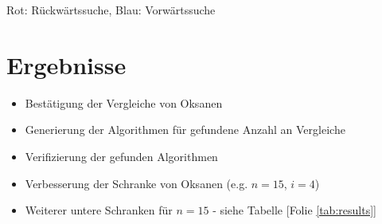 \begin{frame}{\insertsection}
  \begin{figure}[!b]
    \centering
    
  \end{figure}

  {\color{red} Rot: Rückwärtssuche},
  {\color{blue} Blau: Vorwärtssuche}

\end{frame}


\section{Ergebnisse}
\sectionframe{\insertsection}

\begin{frame}{\insertsection}
  \begin{itemize}
    \item Bestätigung der Vergleiche von Oksanen
    \item Generierung der Algorithmen für gefundene Anzahl an Vergleiche
    \item Verifizierung der gefunden Algorithmen
    \item Verbesserung der Schranke von Oksanen (e.g. $n=15$, $i=4$)
    \item Weiterer untere Schranken für $n=15$ - siehe Tabelle [Folie \ref{tab:results}]
  \end{itemize}

\end{frame}

